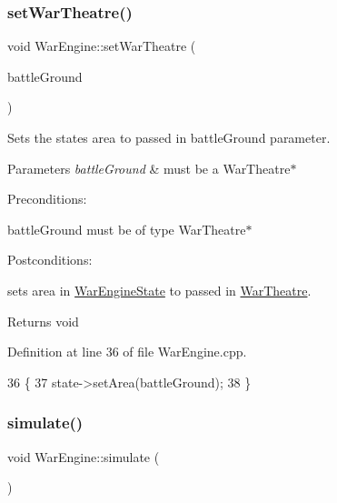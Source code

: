 \subsubsection{\texorpdfstring{set\+War\+Theatre()}{setWarTheatre()}}
{\footnotesize\ttfamily void War\+Engine\+::set\+War\+Theatre (\begin{DoxyParamCaption}\item[{\hyperlink{classWarTheatre}{War\+Theatre} $\ast$}]{battle\+Ground }\end{DoxyParamCaption})}



Sets the state\textquotesingle{}s area to passed in battle\+Ground parameter. 


\begin{DoxyParams}{Parameters}
{\em battle\+Ground} & must be a War\+Theatre$\ast$\\
\hline
\end{DoxyParams}
Preconditions\+:
\begin{DoxyItemize}
\item battle\+Ground must be of type War\+Theatre$\ast$
\end{DoxyItemize}

Postconditions\+:
\begin{DoxyItemize}
\item sets area in \hyperlink{classWarEngineState}{War\+Engine\+State} to passed in \hyperlink{classWarTheatre}{War\+Theatre}.
\end{DoxyItemize}

\begin{DoxyReturn}{Returns}
void 
\end{DoxyReturn}


Definition at line 36 of file War\+Engine.\+cpp.


\begin{DoxyCode}
36                                                      \{
37     state->setArea(battleGround);
38 \}
\end{DoxyCode}
\mbox{\label{classWarEngine_a8990aec96d7e77f10b39f4ac05dca43b}} 
\subsubsection{\texorpdfstring{simulate()}{simulate()}}
{\footnotesize\ttfamily void War\+Engine\+::simulate (\begin{DoxyParamCaption}{ }\end{DoxyParamCaption})}



